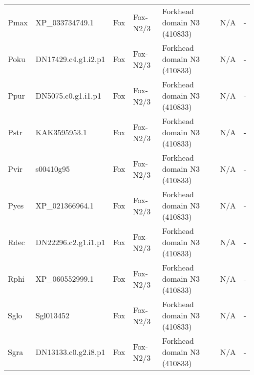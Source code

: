 \documentclass[../main.tex]{subfiles}
\begin{document}
\begin{landscape}
\begin{longtable}{lllllll}
		Pmax           & XP\_033734749.1       & Fox            & Fox-N2/3            & Forkhead domain N3 (410833)                 & N/A                                                                    & -                    \\
		Poku           & DN17429.c4.g1.i2.p1   & Fox            & Fox-N2/3            & Forkhead domain N3 (410833)                 & N/A                                                                    & -                    \\
		Ppur           & DN5075.c0.g1.i1.p1    & Fox            & Fox-N2/3            & Forkhead domain N3 (410833)                 & N/A                                                                    & -                    \\
		Pstr           & KAK3595953.1          & Fox            & Fox-N2/3            & Forkhead domain N3 (410833)                 & N/A                                                                    & -                    \\
		Pvir           & s00410g95             & Fox            & Fox-N2/3            & Forkhead domain N3 (410833)                 & N/A                                                                    & -                    \\
		Pyes           & XP\_021366964.1       & Fox            & Fox-N2/3            & Forkhead domain N3 (410833)                 & N/A                                                                    & -                    \\
		Rdec           & DN22296.c2.g1.i1.p1   & Fox            & Fox-N2/3            & Forkhead domain N3 (410833)                 & N/A                                                                    & -                    \\
		Rphi           & XP\_060552999.1       & Fox            & Fox-N2/3            & Forkhead domain N3 (410833)                 & N/A                                                                    & -                    \\
		Sglo           & Sgl013452             & Fox            & Fox-N2/3            & Forkhead domain N3 (410833)                 & N/A                                                                    & -                    \\
		Sgra           & DN13133.c0.g2.i8.p1   & Fox            & Fox-N2/3            & Forkhead domain N3 (410833)                 & N/A                                                                    & -                    \\

\end{longtable}
\end{landscape}
\end{document}
